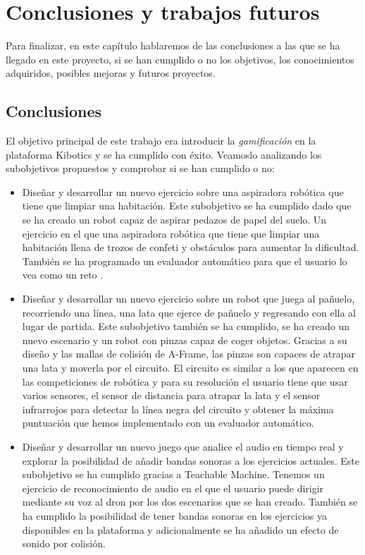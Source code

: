 \chapter{Conclusiones y trabajos futuros}\label{conclusion}
Para finalizar, en este capítulo hablaremos de las conclusiones a las que se ha llegado en este proyecto, si se han cumplido o no los objetivos,  los conocimientos adquiridos, posibles mejoras y futuros proyectos.

\section{Conclusiones}

El objetivo principal de este trabajo era introducir la \textit{gamificación} en la plataforma Kibotics y se ha cumplido con éxito. Veamoslo analizando los subobjetivos propuestos y comprobar si se han cumplido o no:

\begin{itemize}
    \item Diseñar y desarrollar un nuevo ejercicio sobre una aspiradora robótica que tiene que limpiar una habitación.  Este subobjetivo se ha cumplido dado que se ha creado un robot capaz de aspirar pedazos de papel del suelo. Un ejercicio en el que una aspiradora robótica que tiene que limpiar una habitación llena de trozos de confeti y obstáculos para aumentar la dificultad. También se ha programado un evaluador automático para que el usuario lo vea como un reto .

    \item Diseñar y desarrollar un nuevo ejercicio sobre un robot que juega al pañuelo, recorriendo una línea, una lata que ejerce de pañuelo y regresando con ella al lugar de partida. Este subobjetivo también se ha cumplido, se ha creado un nuevo escenario y un robot con pinzas capaz de coger objetos. Gracias a su diseño y las mallas de colisión de A-Frame, las pinzas son capaces de atrapar una lata y moverla por el circuito. El circuito es similar a los que aparecen en las competiciones de robótica y para su resolución el usuario tiene que usar varios sensores, el sensor de distancia para atrapar la lata y el sensor infrarrojos para detectar la línea negra del circuito y obtener la máxima puntuación que hemos implementado con un evaluador automático. 
    
        \item Diseñar y desarrollar un nuevo juego que analice el audio en tiempo real y explorar la posibilidad de añadir bandas sonoras a los ejercicios actuales.  Este subobjetivo se ha cumplido gracias a Teachable Machine. Tenemos un ejercicio de reconocimiento de audio en el que el usuario puede dirigir mediante su voz al dron por los dos escenarios que se han creado. También se ha cumplido la posibilidad de tener bandas sonoras en los ejercicios ya disponibles en la plataforma y adicionalmente se ha añadido un efecto de sonido por colisión. 

\end{itemize}

